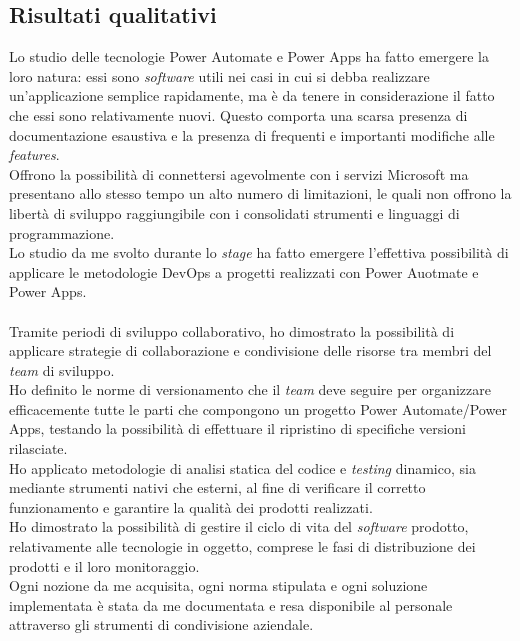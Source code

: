 \subsection{Risultati qualitativi}
Lo studio delle tecnologie Power Automate e Power Apps ha fatto emergere la loro natura: essi sono \emph{software} utili nei casi in cui si debba realizzare un'applicazione semplice rapidamente, ma è da tenere in considerazione il fatto che essi sono relativamente nuovi.
Questo comporta una scarsa presenza di documentazione esaustiva e la presenza di frequenti e importanti modifiche alle \emph{features}.\\
Offrono la possibilità di connettersi agevolmente con i servizi Microsoft ma presentano allo stesso tempo un alto numero di limitazioni, le quali non offrono la libertà di sviluppo raggiungibile con i consolidati strumenti e linguaggi di programmazione.\\ 
Lo studio da me svolto durante lo \emph{stage} ha fatto emergere l'effettiva possibilità di applicare le metodologie \gls{DevOps} a progetti realizzati con Power Auotmate e Power Apps.\\\\
Tramite periodi di sviluppo collaborativo, ho dimostrato la possibilità di applicare strategie di collaborazione e condivisione delle risorse tra membri del \emph{team} di sviluppo.\\
Ho definito le norme di versionamento che il \emph{team} deve seguire per organizzare efficacemente tutte le parti che compongono un progetto Power Automate/Power Apps, testando la possibilità di effettuare il ripristino di specifiche versioni rilasciate.\\ 
Ho applicato metodologie di analisi statica del codice e \emph{testing} dinamico, sia mediante strumenti nativi che esterni, al fine di verificare il corretto funzionamento e garantire la qualità dei prodotti realizzati.\\ 
Ho dimostrato la possibilità di gestire il ciclo di vita del \emph{software} prodotto, relativamente alle tecnologie in oggetto, comprese le fasi di distribuzione dei prodotti e il loro monitoraggio.\\ 
Ogni nozione da me acquisita, ogni norma stipulata e ogni soluzione implementata è stata da me documentata e resa disponibile al personale attraverso gli strumenti di condivisione aziendale. 

